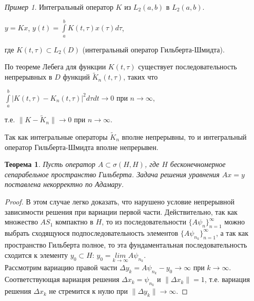 \documentclass[12pt,a4paper,titlepage, oneside]{book}
\theoremstyle{definition}
\theoremstyle{plain}
\newtheorem*{theorem}{Теорема}
\theoremstyle{remark}
\theoremstyle{remark}
\newtheorem*{example}{Пример}
\theoremstyle{remark}
\theoremstyle{plain}
\theoremstyle{plain}
\begin{document}
\begin{example}Интегральный оператор $K$ из $L_2(a,b)$ в $L_2(a,b)$.
\begin{center}
$y=Kx$, $y(t)=\int\limits_a^b K(t, \tau)x(\tau)d\tau $,
\end{center}
где $K(t, \tau)\subset L_2(D)$ (интегральный оператор Гильберта-Шмидта).

По теореме Лебега для функции $K(t, \tau)$ существует последовательность непрерывных в $D$ функций $\widetilde{K}_n (t, \tau)$, таких что
\begin{center}
$\int\limits_a^b |K(t, \tau)-K_n(t, \tau)|^2d\tau dt \to 0$ при $n\to \infty$,
\end{center}
\begin{center}
т.е. $\lVert K-\widetilde{K}_n \rVert \to 0$ при $n\to \infty$.
\end{center}

Так как интегральные операторы $\widetilde{K}_n$ вполне непрерывны, то и интегральный оператор Гильберта-Шмидта вполне непрерывен.
\end{example}

\begin{theorem}
Пусть оператор $A \subset \sigma (H,H)$, где $H$ бесконечномерное сепарабельное пространство Гильберта. Задача решения уравнения $Ax=y$ поставлена некорректно по Адамару.
\end{theorem}

\begin{proof}
В этом случае легко доказать, что нарушено условие непрерывной зависимости решения при вариации первой части. Действительно, так как множество $AS_1$ компактно в $H$, то из последовательности $\lbrace A \psi_n\rbrace_{n=1}^{\infty}$ можно выбрать сходящуюся подпоследовательность элементов $\lbrace A \psi_{n_k}\rbrace_{n=1}^{\infty}$, а так как пространство Гильберта полное, то эта фундаментальная последовательность сходится к элементу $y_0 \subset H$: $y_0=\underset{k \to \infty}{lim} A \psi_{n_k}$.\\

Рассмотрим вариацию правой части $\Delta y_k=A \psi_{n_k}-y_0 \to \infty$ при $k\to \infty$. Соответствующая вариация решения $\Delta x_k=\psi_{n_k}$ и $\lVert\Delta x_k \rVert=1$, т.е. вариация решения $\Delta x_k$ не стремится к нулю при $\lVert\Delta y_k \rVert \to \infty$.
\end{proof}
\end{document}
